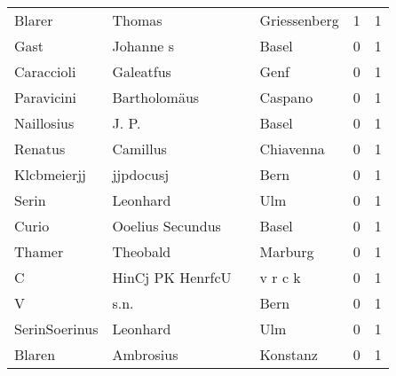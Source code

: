 \begin{center}
\begin{tiny}
\begin{longtabu}{llllrr}
                   Blarer &                             Thomas &             &                                Griessenberg &          1 &         1 \\
                     Gast &                          Johanne s &             &                                       Basel &          0 &         1 \\
               Caraccioli &                          Galeatfus &             &                                        Genf &          0 &         1 \\
               Paravicini &                       Bartholomäus &             &                                     Caspano &          0 &         1 \\
               Naillosius &                              J. P. &             &                                       Basel &          0 &         1 \\
                  Renatus &                           Camillus &             &                                   Chiavenna &          0 &         1 \\
              Klcbmeierjj &                          jjpdocusj &             &                                        Bern &          0 &         1 \\
                    Serin &                           Leonhard &             &                                         Ulm &          0 &         1 \\
                    Curio &                   Ooelius Secundus &             &                                       Basel &          0 &         1 \\
                   Thamer &                           Theobald &             &                                     Marburg &          0 &         1 \\
                        C &                   HinCj PK HenrfcU &             &                                     v r c k &          0 &         1 \\
                        V &                               s.n. &             &                                        Bern &          0 &         1 \\
            SerinSoerinus &                           Leonhard &             &                                         Ulm &          0 &         1 \\
                   Blaren &                          Ambrosius &             &                                    Konstanz &          0 &         1 \\

\end{longtabu}
\end{tiny}
\end{center}
